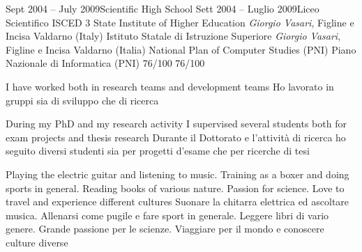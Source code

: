 \begin{europasscv}
      \school
      {Sept 2004 -- July 2009}{Scientific High School}
      {Sett 2004 -- Luglio 2009}{Liceo Scientifico}
      {ISCED 3}
        \schoolLocation
          {State Institute of Higher Education \textit{Giorgio Vasari}, Figline e Incisa Valdarno (Italy)}
          {Istituto Statale di Istruzione Superiore \textit{Giorgio Vasari}, Figline e Incisa Valdarno (Italia)}
        \schoolFaculty
          {National Plan of Computer Studies (PNI)}
          {Piano Nazionale di Informatica (PNI)}
        \finalRank
          {76/100}
          {76/100}
    
    \personalSkills
    
      
      \communicationSkills
        {I have worked both in research teams and development teams}
        {Ho lavorato in gruppi sia di sviluppo che di ricerca}
      
      \organisationalSkills
        {During my PhD and my research activity I supervised several students both for exam projects and thesis research}
        {Durante il Dottorato e l'attività di ricerca ho seguito diversi studenti sia per progetti d'esame che per ricerche di tesi}
        
      \computerSkills
        {}
        {}
        
      \otherSkills
        {Playing the electric guitar and listening to music. Training as a boxer and doing sports in general. Reading books of various nature. Passion for science. Love to travel and experience different cultures}
        {Suonare la chitarra elettrica ed ascoltare musica. Allenarsi come pugile e fare sport in generale. Leggere libri di vario genere. Grande passione per le scienze. Viaggiare per il mondo e conoscere culture diverse}
        

\end{europasscv}
